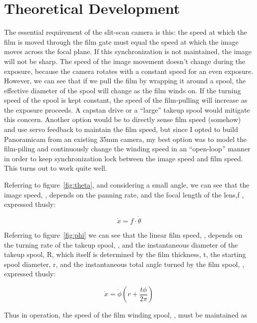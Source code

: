 \documentclass[dvips,12pt]{article}
\begin{document}
\section{Theoretical Development}

The essential requirement of the slit-scan camera is this: the speed at which the film is moved through the film gate must equal the speed at which the image moves across the focal plane. If this synchronization is not maintained, the image will not be sharp. 
The speed of the image movement doesn't change during the exposure, because
the camera rotates with a constant speed for an even exposure. However, we
can see that if we pull the film by wrapping it around a spool, the
effective diameter of the spool will change as the film winds on. If the
turning speed of the spool is kept constant, the speed of the film-pulling will increase as the exposure proceeds. A capstan drive or a ``large'' takeup spool would mitigate this concern. Another option would be to directly sense film speed (somehow) and use servo feedback to maintain the film speed, but since I opted to build Panoramicam from an existing 35mm camera, my best option was to model the film-piling and continuously change the winding speed in an ``open-loop'' manner in order to keep synchronization lock between the image speed and film speed. This turns out to work quite well. 

Referring to figure~\ref{fig:theta}, and considering a small angle, we can see that the image speed, \math {} \), depends on the panning rate, \math \dot{\theta} \) and the focal length of the lens,\math f \), expressed thusly:

\begin{displaymath}
\dot{x} = f \cdot \dot{\theta }
\end{displaymath}

Referring to figure~\ref{fig:phi} we can see that the linear film speed, \math {}\) , depends on the turning rate of the takeup spool, \math \dot{\phi}\), and the instantaneous diameter of the takeup spool, \math R\), which itself is determined by the film thickness, \math t\), the starting spool diameter, \math r\), and the instantaneous total angle turned by the film spool, \math \phi \), expressed thusly:

\begin{displaymath}
\dot{x} = \dot{\phi} \left( r+\frac{t\phi}{2\pi}\right)
\end{displaymath}

Thus in operation, the speed of the film winding spool, \math \dot{\theta} \), must be maintained as
\end{document}
